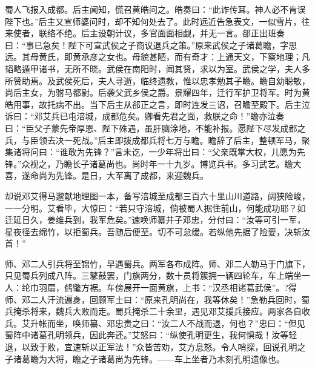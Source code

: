 蜀人飞报入成都。后主闻知，慌召黄皓问之。皓奏曰：“此诈传耳。神人必不肯误陛下也。”后主又宣师婆问时，却不知何处去了。此时远近告急表文，一似雪片，往来使者，联络不绝。后主设朝计议，多官面面相觑，并无一言。郤正出班奏曰：“事已急矣！陛下可宣武侯之子商议退兵之策。”原来武侯之子诸葛瞻，字思远。其母黄氏，即黄承彦之女也。母貌甚陋，而有奇才：上通天文，下察地理；凡韬略遁甲诸书，无所不晓。武侯在南阳时，闻其贤，求以为室。武侯之学，夫人多所赞助焉。及武侯死后，夫人寻逝，临终遗教，惟以忠孝勉其子瞻。瞻自幼聪敏，尚后主女，为驸马都尉。后袭父武乡侯之爵。景耀四年，迁行军护卫将军。时为黄皓用事，故托病不出。当下后主从郤正之言，即时连发三诏，召瞻至殿下。后主泣诉曰：“邓艾兵已屯涪城，成都危矣。卿看先君之面，救朕之命！”瞻亦泣奏曰：“臣父子蒙先帝厚恩、陛下殊遇，虽肝脑涂地，不能补报。愿陛下尽发成都之兵，与臣领去决一死战。”后主即拨成都兵将七万与瞻。瞻辞了后主，整顿军马，聚集诸将问曰：“谁敢为先锋？”言未讫，一少年将出曰：“父亲既掌大权，儿愿为先锋。”众视之，乃瞻长子诸葛尚也。尚时年一十九岁。博览兵书。多习武艺。瞻大喜，遂命尚为先锋。是日，大军离了成都，来迎魏兵。

却说邓艾得马邈献地理图一本，备写涪城至成都三百六十里山川道路，阔狭险峻，一一分明。艾看毕，大惊曰：“若只守涪城，倘被蜀人据住前山，何能成功耶？如迁延日久，姜维兵到，我军危矣。”速唤师纂并子邓忠，分付曰：“汝等可引一军，星夜径去绵竹，以拒蜀兵。吾随后便至。切不可怠缓。若纵他先据了险要，决斩汝首！”

师、邓二人引兵将至锦竹，早遇蜀兵。两军各布成阵。师、邓二人勒马于门旗下，只见蜀兵列成八阵。三鼕鼓罢，门旗两分，数十员将簇拥一辆四轮车，车上端坐一人：纶巾羽扇，鹤氅方裾。车傍展开一面黄旗，上书：“汉丞相诸葛武侯”。?得师、邓二人汗流遍身，回顾军士曰：“原来孔明尚在，我等休矣！”急勒兵回时，蜀兵掩杀将来，魏兵大败而走。蜀兵掩杀二十余里，遇见邓艾援兵接应。两家各自收兵。艾升帐而坐，唤师纂、邓忠责之曰：“汝二人不战而退，何也？”忠曰：“但见蜀阵中诸葛孔明领兵，因此奔还。”艾怒曰：“纵使孔明更生，我何惧哉！汝等轻退，以致于败，宜速斩以正军法！”众皆苦劝，艾方息怒。令人哨探，回说孔明之子诸葛瞻为大将，瞻之子诸葛尚为先锋。——车上坐者乃木刻孔明遗像也。

